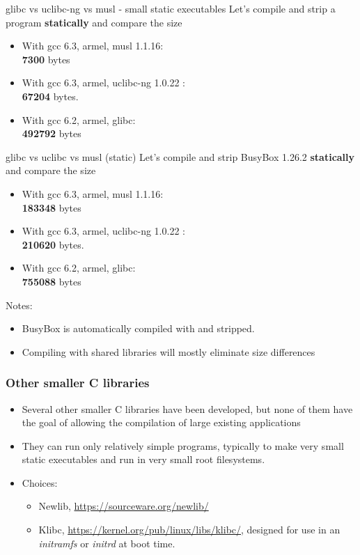 \begin{frame}{glibc vs uclibc-ng vs musl - small static executables}
  Let's compile and strip a  program {\bf statically} and
compare the size
  \begin{itemize}
    \item With gcc 6.3, armel, musl 1.1.16:\\
          {\bf 7300} bytes
    \item With gcc 6.3, armel, uclibc-ng 1.0.22 :\\
          {\bf 67204} bytes.
    \item With gcc 6.2, armel, glibc:\\
          {\bf 492792} bytes
  \end{itemize}
\end{frame}

\begin{frame}{glibc vs uclibc vs musl (static)}
  Let's compile and strip BusyBox 1.26.2 {\bf statically} and compare the size
  \begin{itemize}
    \item With gcc 6.3, armel, musl 1.1.16:\\
          {\bf 183348} bytes
    \item With gcc 6.3, armel, uclibc-ng 1.0.22 :\\
          {\bf 210620} bytes.\\
    \item With gcc 6.2, armel, glibc:\\
          {\bf 755088} bytes
  \end{itemize}
  Notes:
  \begin{itemize}
    \item BusyBox is automatically compiled with  and stripped.
    \item Compiling with shared libraries will mostly eliminate size differences
  \end{itemize}
\end{frame}

\begin{frame}
  \frametitle{Other smaller C libraries}
  \begin{itemize}
  \item Several other smaller C libraries have been developed, but
    none of them have the goal of allowing the compilation of large
    existing applications
  \item They can run only relatively simple programs,
	typically to make very small static executables and run
	in very small root filesystems.
  \item Choices:
    \begin{itemize}
    \item Newlib, \url{https://sourceware.org/newlib/}
    \item Klibc, \url{https://kernel.org/pub/linux/libs/klibc/},
      designed for use in an {\em initramfs} or {\em initrd} at boot
      time.
    \end{itemize}
  \end{itemize}
\end{frame}

